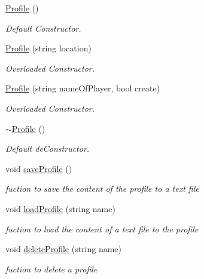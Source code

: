 \begin{DoxyCompactItemize}
\item 
\hyperlink{class_profile_a4eea708cdbed0262d9e7ddbe3f1e3f89}{Profile} ()
\begin{DoxyCompactList}\small\item\em Default Constructor. \end{DoxyCompactList}\item 
\hyperlink{class_profile_a2f1ced1b7bf7fc6d54468f645ba9899c}{Profile} (string location)
\begin{DoxyCompactList}\small\item\em Overloaded Constructor. \end{DoxyCompactList}\item 
\hyperlink{class_profile_a69b3d3c58a1db8e6edeea0c48f40ab4b}{Profile} (string name\+Of\+Player, bool create)
\begin{DoxyCompactList}\small\item\em Overloaded Constructor. \end{DoxyCompactList}\item 
\hyperlink{class_profile_a58fa758a59bc4ee3c1a9980e360e4e98}{$\sim$\+Profile} ()
\begin{DoxyCompactList}\small\item\em Default de\+Constructor. \end{DoxyCompactList}\item 
\hypertarget{class_profile_a21c59434bd6dec62c974b208caf2ff58}{}\label{class_profile_a21c59434bd6dec62c974b208caf2ff58} 
void \hyperlink{class_profile_a21c59434bd6dec62c974b208caf2ff58}{save\+Profile} ()
\begin{DoxyCompactList}\small\item\em fuction to save the content of the profile to a text file \end{DoxyCompactList}\item 
\hypertarget{class_profile_afe06c4b329f11dce5478f17c201a0dff}{}\label{class_profile_afe06c4b329f11dce5478f17c201a0dff} 
void \hyperlink{class_profile_afe06c4b329f11dce5478f17c201a0dff}{load\+Profile} (string name)
\begin{DoxyCompactList}\small\item\em fuction to load the content of a text file to the profile \end{DoxyCompactList}\item 
\hypertarget{class_profile_ac1e3c9978e12cb532f5a9582a735d990}{}\label{class_profile_ac1e3c9978e12cb532f5a9582a735d990} 
void \hyperlink{class_profile_ac1e3c9978e12cb532f5a9582a735d990}{delete\+Profile} (string name)
\begin{DoxyCompactList}\small\item\em fuction to delete a profile \end{DoxyCompactList}\end{DoxyCompactItemize}
